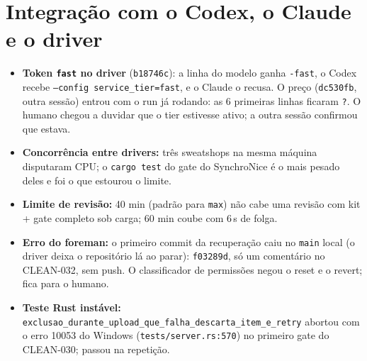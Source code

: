 \documentclass[11pt,a4paper]{article}
\begin{document}
\section{Integração com o Codex, o Claude e o driver}
\begin{itemize}
  \item \textbf{Token \texttt{fast} no driver} (\texttt{b18746c}): a linha do
        modelo ganha \texttt{-fast}, o Codex recebe
        \texttt{--config service\_tier=fast}, e o Claude o recusa. O preço
        (\texttt{dc530fb}, outra sessão) entrou com o run já rodando: as 6
        primeiras linhas ficaram \texttt{?}. O humano chegou a duvidar que o
        tier estivesse ativo; a outra sessão confirmou que estava.
  \item \textbf{Concorrência entre drivers:} três sweatshops na mesma máquina
        disputaram CPU; o \texttt{cargo test} do gate do SynchroNice é o mais
        pesado deles e foi o que estourou o limite.
  \item \textbf{Limite de revisão:} 40 min (padrão para \texttt{max}) não cabe
        uma revisão com kit + gate completo sob carga; 60 min coube com 6\,s
        de folga.
  \item \textbf{Erro do foreman:} o primeiro commit da recuperação caiu no
        \texttt{main} local (o driver deixa o repositório lá ao parar):
        \texttt{f03289d}, só um comentário no CLEAN-032, sem push. O
        classificador de permissões negou o reset e o revert; fica para o
        humano.
  \item \textbf{Teste Rust instável:}
        \texttt{exclusao\_durante\_upload\_que\_falha\_descarta\_item\_e\_retry}
        abortou com o erro 10053 do Windows (\texttt{tests/server.rs:570}) no
        primeiro gate do CLEAN-030; passou na repetição.
\end{itemize}
\end{document}
